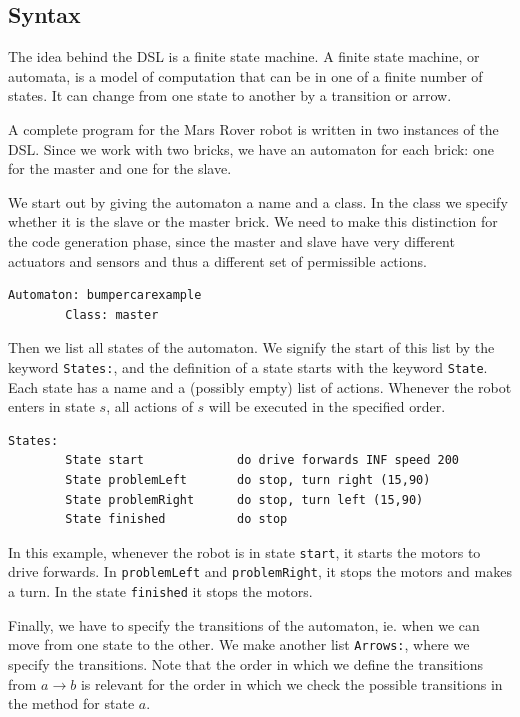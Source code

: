 \documentclass[11pt,a4paper]{article}
\begin{document}
\subsection{Syntax} 
The idea behind the DSL is a finite state machine. 
A finite state machine, or automata, is a model of computation that can be in one of a finite number of states. It can change from one state to another by a transition or arrow.

A complete program for the Mars Rover robot is written in two instances of the DSL. Since we work with two bricks, we have an automaton for each brick: one for the master and one for the slave.

We start out by giving the automaton a name and a class. In the class we specify whether it is the slave or the master brick. We need to make this distinction for the code generation phase, since the master and slave have very different actuators and sensors and thus a different set of permissible actions.

\begin{verbatim}
Automaton: bumpercarexample
        Class: master
\end{verbatim}

Then we list all states of the automaton. 
We signify the start of this list by the keyword \texttt{States:}, and the definition of a state starts with the keyword \texttt{State}.
Each state has a name and a (possibly empty) list of actions. 
Whenever the robot enters in state $s$, all actions of $s$ will be executed in the specified order.

\begin{verbatim}
States: 
        State start             do drive forwards INF speed 200
        State problemLeft       do stop, turn right (15,90)
        State problemRight      do stop, turn left (15,90)
        State finished          do stop
\end{verbatim}

In this example, whenever the robot is in state \texttt{start}, it starts the motors to drive forwards. In \texttt{problemLeft} and \texttt{problemRight}, it stops the motors and makes a turn. In the state \texttt{finished} it stops the motors.

Finally, we have to specify the transitions of the automaton, ie. when we can move from one state to the other. We make another list \texttt{Arrows:}, where we specify the transitions. Note that the order in which we define the transitions from $a \rightarrow b$ is relevant for the order in which we check the possible transitions in the method for state $a$.
\end{document}

